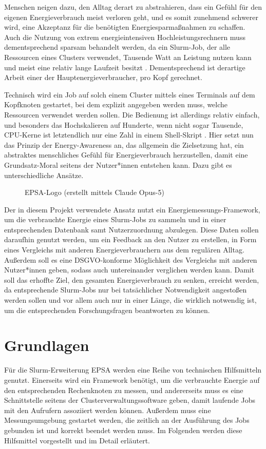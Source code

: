 \documentclass[paper=a4, fontsize=11pt]{scrartcl} %
\numberwithin{equation}{section} %
\numberwithin{figure}{section} %
\numberwithin{table}{section} %
\begin{document}
Menschen neigen dazu, den Alltag derart zu abstrahieren, dass ein Gefühl für den eigenen Energieverbrauch meist verloren geht, und es somit zunehmend schwerer wird, eine Akzeptanz für die benötigten Energiesparmaßnahmen zu schaffen. Auch die Nutzung von extrem energieintensiven Hochleistungsrechnern muss dementsprechend sparsam behandelt werden, da ein Slurm-Job, der alle Ressourcen eines Clusters verwendet, Tausende Watt an Leistung nutzen kann und meist eine relativ lange Laufzeit besitzt \cite{inbook}. Dementsprechend ist derartige Arbeit einer der Hauptenergieverbraucher, pro Kopf gerechnet. 

Technisch wird ein Job auf solch einem Cluster mittels eines Terminals auf dem Kopfknoten gestartet, bei dem explizit angegeben werden muss, welche Ressourcen verwendet werden sollen. Die Bedienung ist allerdings relativ einfach, und besonders das Hochskalieren auf Hunderte, wenn nicht sogar Tausende, CPU-Kerne ist letztendlich nur eine Zahl in einem Shell-Skript \cite{slurmdoc}. Hier setzt nun das Prinzip der Energy-Awareness an, das allgemein die Zielsetzung hat, ein abstraktes menschliches Gefühl für Energieverbrauch herzustellen, damit eine Grundsatz-Moral seitens der Nutzer*innen entstehen kann. Dazu gibt es unterschiedliche Ansätze. 
\begin{figure}[htbp]
  \centering
  
  \caption{EPSA-Logo (erstellt mittels Claude Opus-5)}
\end{figure}
Der in diesem Projekt verwendete Ansatz nutzt ein Energiemessungs-Framework, um die verbrauchte Energie eines Slurm-Jobs zu sammeln und in einer entsprechenden Datenbank samt Nutzerzuordnung abzulegen. Diese Daten sollen daraufhin genutzt werden, um ein Feedback an den Nutzer zu erstellen, in Form eines Vergleichs mit anderen Energieverbrauchern aus dem regulären Alltag. Außerdem soll es eine DSGVO-konforme Möglichkeit des Vergleichs mit anderen Nutzer*innen geben, sodass auch untereinander verglichen werden kann. Damit soll das erhoffte Ziel, den gesamten Energieverbrauch zu senken, erreicht werden, da entsprechende Slurm-Jobs nur bei tatsächlicher Notwendigkeit angestoßen werden sollen und vor allem auch nur in einer Länge, die wirklich notwendig ist, um die entsprechenden Forschungsfragen beantworten zu können. 

\newpage
\section{Grundlagen}
Für die Slurm-Erweiterung EPSA werden eine Reihe von technischen Hilfsmitteln genutzt. Einerseits wird ein Framework benötigt, um die verbrauchte Energie auf den entsprechenden Rechenknoten zu messen, und andererseits muss es eine Schnittstelle seitens der Clusterverwaltungssoftware geben, damit laufende Jobs mit den Aufrufern assoziiert werden können. Außerdem muss eine Messungsumgebung gestartet werden, die zeitlich an der Ausführung des Jobs gebunden ist und korrekt beendet werden muss. Im Folgenden werden diese Hilfsmittel vorgestellt und im Detail erläutert.
\end{document}
